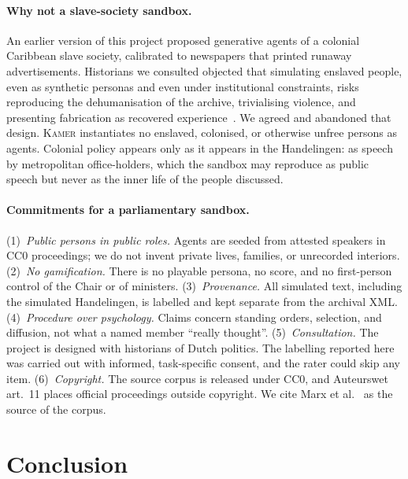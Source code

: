 \documentclass[sigconf,review,anonymous]{acmart}
\newcommand{\sys}{\textsc{Kamer}}
\begin{document}
\paragraph{Why not a slave-society sandbox.} An earlier version of this
project proposed generative agents of a colonial Caribbean slave society,
calibrated to newspapers that printed runaway advertisements. Historians we
consulted objected that simulating enslaved people, even as synthetic
personas and even under institutional constraints, risks reproducing the
dehumanisation of the archive, trivialising violence, and presenting
fabrication as recovered
experience~\cite{hartman2008venus,fuentes2016dispossessed}. We agreed and
abandoned that design. \sys{} instantiates no enslaved, colonised, or
otherwise unfree persons as agents. Colonial policy appears only as it
appears in the Handelingen: as speech by metropolitan office-holders,
which the sandbox may reproduce as public speech but never as the inner
life of the people discussed.

\paragraph{Commitments for a parliamentary sandbox.}
(1)~\emph{Public persons in public roles.} Agents are seeded from
attested speakers in CC0 proceedings; we do not invent private lives,
families, or unrecorded interiors.
(2)~\emph{No gamification.} There is no playable persona, no score, and
no first-person control of the Chair or of ministers.
(3)~\emph{Provenance.} All simulated text, including the simulated
Handelingen, is labelled and kept separate from the archival XML.
(4)~\emph{Procedure over psychology.} Claims concern standing orders,
selection, and diffusion, not what a named member ``really thought''.
(5)~\emph{Consultation.} The project is designed with historians of
Dutch politics. The labelling reported here was carried out with informed,
task-specific consent, and the rater could skip any item.
(6)~\emph{Copyright.} The source corpus is released under CC0, and
Auteurswet art.~11 places official proceedings outside copyright. We cite
Marx et al.~\cite{marx2012dutchparl} as the source of the corpus.

\section{Conclusion}
\label{sec:conclusion}
\end{document}

